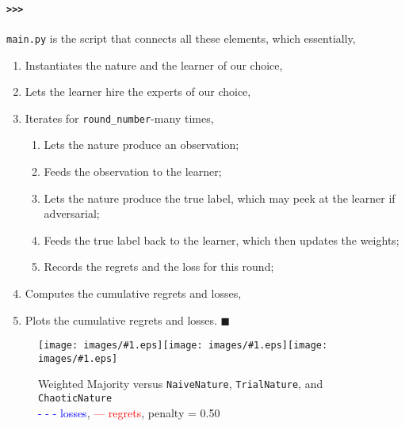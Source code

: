 \documentclass{article}
\newcommand{\qed}{\hfill$\blacksquare$}
\begin{document}
\paragraph{\tt >>>} {\tt main.py} is the script that connects all these elements, which essentially, 
\begin{enumerate}\itemsep-1pt
	\item Instantiates the nature and the learner of our choice,
	\item Lets the learner hire the experts of our choice, 
	\item Iterates for {\tt round\_number}-many times, 
	\begin{enumerate}
		\item Lets the nature produce an observation; 
		\item Feeds the observation to the learner; 
		\item Lets the nature produce the true label, which may peek at the learner if adversarial; 
		\item Feeds the true label back to the learner, which then updates the weights;
		\item Records the regrets and the loss for this round; 
	\end{enumerate}
	\item Computes the cumulative regrets and losses, 
	\item Plots the cumulative regrets and losses. \qed
\end{enumerate}

\newpage
\newcommand{\rlplot}[1]{\texttt{[image: images/\#1.eps]}\label{#1}}
\begin{figure}
	\centering\rlplot{wma-naive}\rlplot{wma-trial}\rlplot{wma-chaotic}
	\caption{Weighted Majority versus {\tt NaiveNature}, {\tt TrialNature}, and {\tt ChaoticNature} \\
		{\footnotesize\textcolor{blue}{- - - losses}, \textcolor{red}{--- regrets}, penalty = 0.50}}
	\label{wma-vs-3natures}
\end{figure}
\end{document}
